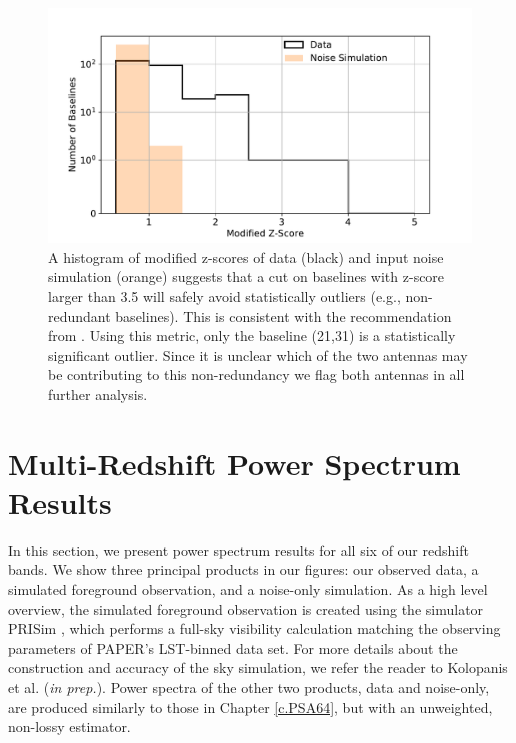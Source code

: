\begin{figure}[tp]
	\centering
	\includegraphics[width=.85\textwidth]{plots/zscore_hist.pdf}
	\caption{A histogram of modified z-scores of data (black) 
		and input noise simulation (orange) suggests that a cut on baselines
		with z-score larger than 3.5 will safely avoid statistically outliers (e.g., non-redundant baselines). This is consistent with the
		recommendation from \cite{Iglewicz_and_hoaglin}. Using this metric,
		only the baseline (21,31) is a statistically significant outlier. Since it is unclear which of the two antennas may be contributing to this non-redundancy we flag both antennas in all further analysis.} %
\label{fig:mod_z_score_avg}
\end{figure}

\section{Multi-Redshift Power Spectrum Results}\label{sec:pspec_results}

In this section, we present power spectrum results for all six of our redshift bands. We show three principal products in our figures: our observed data, a simulated foreground observation, and a noise-only simulation. As a high level overview, the simulated foreground observation is created using the simulator PRISim \citep{Thyagarajan_et_al2015b, Thyagarajan_et_al2015a}, which performs a full-sky visibility calculation matching the observing parameters of PAPER's LST-binned data set. For more details about the construction and accuracy of the sky simulation, we refer the reader to Kolopanis et al. (\textit{in prep.}). Power spectra of the other two products, data and noise-only, are produced similarly to those in Chapter \ref{c.PSA64}, but with an unweighted, non-lossy estimator.

